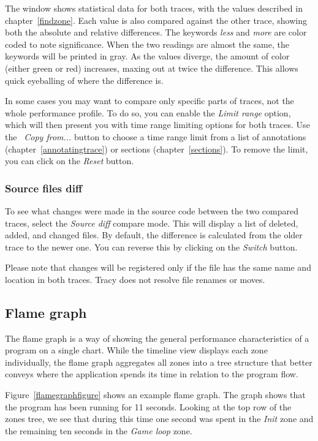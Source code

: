 \documentclass[hidelinks,titlepage,a4paper,twoside]{article}
\begin{document}
The window shows statistical data for both traces, with the values described in chapter~\ref{findzone}. Each value is also compared against the other trace, showing both the absolute and relative differences. The keywords \emph{less} and \emph{more} are color coded to note significance. When the two readings are almost the same, the keywords will be printed in gray. As the values diverge, the amount of color (either green or red) increases, maxing out at twice the difference. This allows quick eyeballing of where the difference is.

In some cases you may want to compare only specific parts of traces, not the whole performance profile. To do so, you can enable the \emph{Limit range} option, which will then present you with time range limiting options for both traces. Use the \emph{\faCopy{}~Copy from...} button to choose a time range limit from a list of annotations (chapter~\ref{annotatingtrace}) or sections (chapter~\ref{sections}). To remove the limit, you can click on the \emph{Reset} button.

\subsubsection{Source files diff}
\label{sourcefilesdiff}

To see what changes were made in the source code between the two compared traces, select the \emph{Source diff} compare mode. This will display a list of deleted, added, and changed files. By default, the difference is calculated from the older trace to the newer one. You can reverse this by clicking on the \emph{Switch} button.

Please note that changes will be registered only if the file has the same name and location in both traces. Tracy does not resolve file renames or moves.

\subsection{Flame graph}
\label{flamegraph}

The flame graph is a way of showing the general performance characteristics of a program on a single chart. While the timeline view displays each zone individually, the flame graph aggregates all zones into a tree structure that better conveys where the application spends its time in relation to the program flow.

Figure~\ref{flamegraphfigure} shows an example flame graph. The graph shows that the program has been running for 11 seconds. Looking at the top row of the zones tree, we see that during this time one second was spent in the \emph{Init} zone and the remaining ten seconds in the \emph{Game loop} zone.
\end{document}
